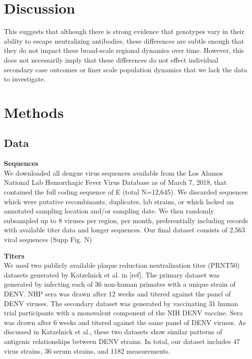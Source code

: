 \documentclass[11pt,oneside,letterpaper]{article}
\begin{document}
\section*{Discussion}

This suggests that although there is strong evidence that genotypes vary in their ability to escape neutralizing antibodies, these differences are subtle enough that they do not impact these broad-scale regional dynamics over time.
However, this does not necessarily imply that these differences do not effect individual secondary case outcomes or finer scale population dynamics that we lack the data to investigate.

\newpage

\section*{Methods}
\subsection*{Data}
\textbf{Sequences}\\
We downloaded all dengue virus sequences available from the Los Alamos National Lab Hemorrhagic Fever Virus Database as of March 7, 2018, that contained the full coding sequence of E (total N=12,645).
We discarded sequences which were putative recombinants, duplicates, lab strains, or which lacked an annotated sampling location and/or sampling date.
We then randomly subsampled up to 8 viruses per region, per month, preferentially including records with available titer data and longer sequences.
Our final dataset consists of 2,563 viral sequences (Supp Fig. N)

\textbf{Titers}\\
We used two publicly available plaque reduction neutralization titer (PRNT50) datasets generated by Katzelnick et al. in {[}ref{]}.
The primary dataset was generated by infecting each of 36 non-human primates with a unique strain of DENV.
NHP sera was drawn after 12 weeks and titered against the panel of DENV viruses.
The secondary dataset was generated by vaccinating 31 human trial participants with a monovalent component of the NIH DENV vaccine.
Sera was drawn after 6 weeks and titered against the same panel of DENV viruses.
As discussed in Katzelnick et al., these two datasets show similar patterns of antigenic relationships between DENV strains.
In total, our dataset includes 47 virus strains, 36 serum strains, and 1182 measurements.
\end{document}

